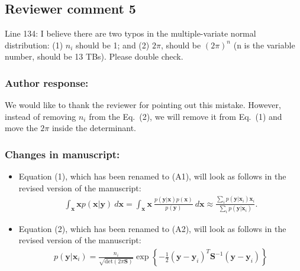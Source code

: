 \subsection*{Reviewer comment 5}

Line 134: I believe there are two typos in the multiple-variate normal distribution: (1) $n_i$ should
be 1; and (2) $2\pi$, should be $(2\pi)^n$ (n is the variable number, should be 13 TBs). Please double
check.

\subsubsection*{Author response:}

We would like to thank the reviewer for pointing out this mistake. However,
instead of removing $n_i$ from the Eq.~(2), we will remove it from Eq.~(1)
and move the $2\pi$ inside the determinant.

\subsubsection*{Changes in manuscript:}

\begin{itemize}
  \item Equation (1), which has been renamed to (A1), will look as follows in the revised
    version of the manuscript:
      \begin{align}\label{eq:gprof_retrieval}
        \int_{\mathbf{x} } \mathbf{x} p(\mathbf{x} | \mathbf{y})\: d\mathbf{x} =
        \int_{\mathbf{x} } \mathbf{x}\: \frac{p(\mathbf{y} |
          \mathbf{x})p(\mathbf{x})}{p(\mathbf{y})}\: d\mathbf{x} \approx \frac{\sum_i
          p(\mathbf{y}|\mathbf{x}_i) \mathbf{x}_i}{\sum_i
          p(\mathbf{y}|\mathbf{x}_i)}.
      \end{align}

    \item Equation (2), which has been renamed to (A2), will look as follows in the revised
      version of the manuscript:
          \begin{align}\label{eq:gprof_error}
            p(\mathbf{y}|\mathbf{x}_i) =
            \frac{n_i}{\sqrt{\text{det}(2\pi\mathbf{S})}} \exp \left \{ - \frac{1}{2}
            (\mathbf{y} - \mathbf{y}_i)^T \mathbf{S}^{-1} (\mathbf{y} - \mathbf{y}_i)
            \right \}
          \end{align}

 \end{itemize}

